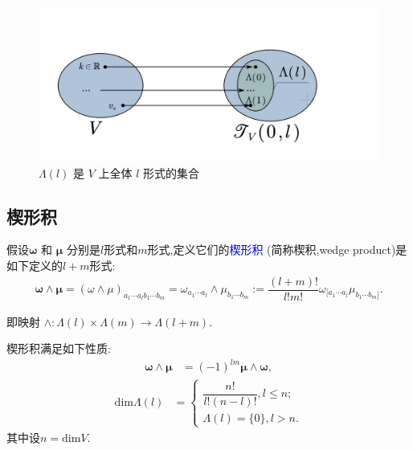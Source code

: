 \begin{figure}[htbp]
    \centering
 \includegraphics[width=\textwidth]{Pictures/5-1.png}
    \caption{$\Lambda(l)$ 是 $V$ 上全体 $l$ 形式的集合}
\end{figure}
\subsection{楔形积}
假设$\boldsymbol{\omega}$ 和 $\boldsymbol{\mu}$ 分别是$l$形式和$m$形式,定义它们的\textcolor{blue}{楔形积} (简称楔积,wedge product)是如下定义的$l+m$形式:
\begin{align}
\boldsymbol{\omega}\wedge\boldsymbol{\mu}=(\omega \wedge\mu)_{a_1\cdots a_lb_1\cdots b_m}
=\omega_{a_1\cdots a_l} \wedge\mu_{b_1\cdots b_m}
:=\dfrac{(l+m)!}{l!m!}\omega_{[a_1\cdots a_l}\mu_{b_1\cdots b_m]}.
\end{align}

即映射 $\wedge:\Lambda(l)\times\Lambda(m)\to\Lambda(l+m)$.

楔形积满足如下性质:
\begin{align}
    \boldsymbol{\omega}\wedge\boldsymbol{\mu}&=(-1)^{lm}\boldsymbol{\mu}\wedge \boldsymbol{\omega},
\end{align}
\begin{align}
    \mathrm{dim}\Lambda(l)&=\left\{
        \begin{aligned}
    \dfrac{n!}{l!(n-l)!},l\leqslant n;\\
    \Lambda(l)=\{0\},l>n.
        \end{aligned}
    \right.
\end{align}
其中设$n=\mathrm{dim}V$.

